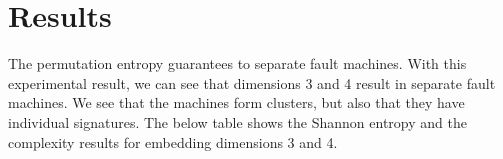 \documentclass[sn-basic,pdflatex]{sn-jnl}
\theoremstyle{remark}
\theoremstyle{definition}
\begin{document}
\section{Results}\label{Results}

The permutation entropy guarantees to separate fault machines. With this
experimental result, we can see that dimensions 3 and 4 result in
separate fault machines. We see that the machines form clusters, but
also that they have individual signatures. The below table shows the
Shannon entropy and the complexity results for embedding dimensions 3
and 4.


\end{document}
